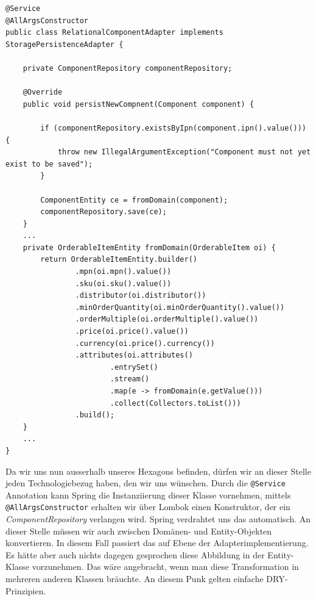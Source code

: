 \begin{listing}[H]
\begin{verbatim}
@Service
@AllArgsConstructor
public class RelationalComponentAdapter implements StoragePersistenceAdapter {

    private ComponentRepository componentRepository;

    @Override
    public void persistNewCompnent(Component component) {

        if (componentRepository.existsByIpn(component.ipn().value())) {
            throw new IllegalArgumentException("Component must not yet exist to be saved");
        }

        ComponentEntity ce = fromDomain(component);
        componentRepository.save(ce);
    }
    ...
    private OrderableItemEntity fromDomain(OrderableItem oi) {
        return OrderableItemEntity.builder()
                .mpn(oi.mpn().value())
                .sku(oi.sku().value())
                .distributor(oi.distributor())
                .minOrderQuantity(oi.minOrderQuantity().value())
                .orderMultiple(oi.orderMultiple().value())
                .price(oi.price().value())
                .currency(oi.price().currency())
                .attributes(oi.attributes()
                        .entrySet()
                        .stream()
                        .map(e -> fromDomain(e.getValue()))
                        .collect(Collectors.toList()))
                .build();
    }
    ...
}
\end{verbatim}
\caption{Persistence Adapter (Klasse nur teilweise dargestellt)}
\label{lst:persistenceAdapter}
\end{listing}

Da wir uns nun ausserhalb unseres Hexagons befinden, dürfen wir an dieser Stelle
jeden Technologiebezug haben, den wir uns wünschen. Durch die \texttt{@Service}
Annotation kann Spring die Instanziierung dieser Klasse vornehmen,
mittels \texttt{@AllArgsConstructor} erhalten wir über Lombok einen
Konstruktor, der ein \textit{ComponentRepository} verlangen wird.
Spring verdrahtet uns das automatisch. An dieser Stelle müssen wir auch
zwischen Domänen- und Entity-Objekten konvertieren. In diesem Fall passiert das
auf Ebene der Adapterimplementierung. Es hätte aber auch nichts dagegen
gesprochen diese Abbildung in der Entity-Klasse vorzunehmen. Das wäre
angebracht, wenn man diese Transformation in mehreren anderen Klassen bräuchte.
An diesem Punk gelten einfache DRY-Prinzipien.
